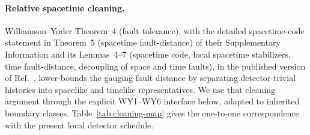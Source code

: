 \documentclass[aps,prx,reprint,superscriptaddress,nofootinbib,floatfix,longbibliography]{revtex4-2}
\theoremstyle{definition}
\begin{document}
\paragraph{Relative spacetime cleaning.}
Williamson--Yoder Theorem~4 (fault tolerance), with the detailed
spacetime-code statement in Theorem~5 (spacetime fault-distance) of their
Supplementary Information and its Lemmas~4--7 (spacetime code, local spacetime
stabilizers, time fault-distance, decoupling of space and time faults), in the
published version of Ref.~\cite{WilliamsonYoderGauging}, lower-bounds the
gauging fault distance by separating detector-trivial histories into
spacelike and timelike representatives.  We
use that cleaning argument through the explicit WY1--WY6 interface below,
adapted to inherited boundary classes.  Table~\ref{tab:cleaning-map} gives the
one-to-one correspondence with the present local detector schedule.
\end{document}
